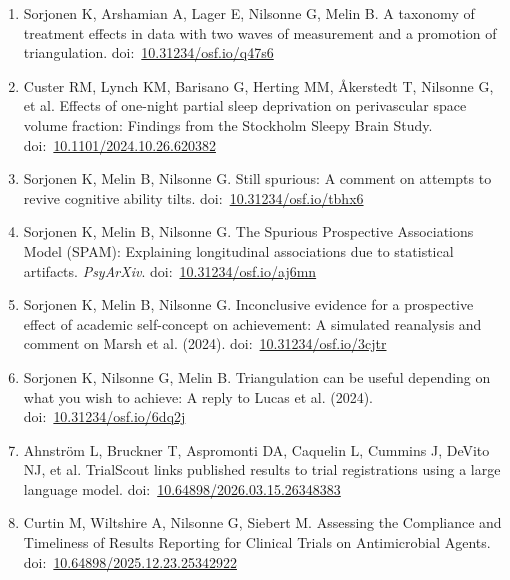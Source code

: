 \documentclass[10pt,a4paper,twocolumn]{article}
\begin{document}
\begin{enumerate}
    \item Sorjonen K, Arshamian A, Lager E, Nilsonne G, Melin B. A taxonomy of treatment effects in data with two waves of measurement and a promotion of triangulation. doi:~\href{https://doi.org/10.31234/osf.io/q47s6}{10.31234/osf.io/q47s6}

    \item Custer RM, Lynch KM, Barisano G, Herting MM, Åkerstedt T, Nilsonne G, et al. Effects of one-night partial sleep deprivation on perivascular space volume fraction: Findings from the Stockholm Sleepy Brain Study. doi:~\href{https://doi.org/10.1101/2024.10.26.620382}{10.1101/2024.10.26.620382}

    \item Sorjonen K, Melin B, Nilsonne G. Still spurious: A comment on attempts to revive cognitive ability tilts. doi:~\href{https://doi.org/10.31234/osf.io/tbhx6}{10.31234/osf.io/tbhx6}

    \item Sorjonen K, Melin B, Nilsonne G. The Spurious Prospective Associations Model (SPAM): Explaining longitudinal associations due to statistical artifacts. \textit{PsyArXiv}. doi:~\href{https://doi.org/10.31234/osf.io/aj6mn}{10.31234/osf.io/aj6mn}

    \item Sorjonen K, Melin B, Nilsonne G. Inconclusive evidence for a prospective effect of academic self-concept on achievement: A simulated reanalysis and comment on Marsh et al. (2024). doi:~\href{https://doi.org/10.31234/osf.io/3cjtr}{10.31234/osf.io/3cjtr}

    \item Sorjonen K, Nilsonne G, Melin B. Triangulation can be useful depending on what you wish to achieve: A reply to Lucas et al. (2024). doi:~\href{https://doi.org/10.31234/osf.io/6dq2j}{10.31234/osf.io/6dq2j}

    \item Ahnström L, Bruckner T, Aspromonti DA, Caquelin L, Cummins J, DeVito NJ, et al. TrialScout links published results to trial registrations using a large language model. doi:~\href{https://doi.org/10.64898/2026.03.15.26348383}{10.64898/2026.03.15.26348383}

    \item Curtin M, Wiltshire A, Nilsonne G, Siebert M. Assessing the Compliance and Timeliness of Results Reporting for Clinical Trials on Antimicrobial Agents. doi:~\href{https://doi.org/10.64898/2025.12.23.25342922}{10.64898/2025.12.23.25342922}


\end{enumerate}
\end{document}
